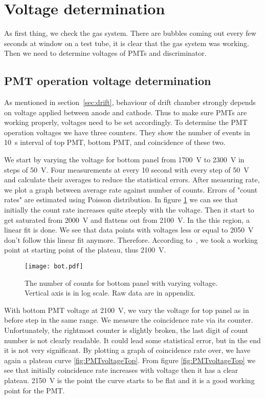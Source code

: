 \clearpage
\section{Voltage determination}\label{sec:vol}
As first thing, we check the gas system. There are bubbles coming out every few seconds at window on a test tube, it is clear that the gas system was working. Then we need to determine voltages of PMTs and discriminator. 

\subsection{PMT operation voltage determination}
As mentioned in section~\ref{sec:drift}, behaviour of drift chamber strongly depends on voltage applied between anode and cathode. Thus to make sure PMTs are working properly, voltages need to be set accordingly. To determine the PMT operation voltages we have three counters. They show the number of events in \SI{10}{\s} interval of top PMT, bottom PMT, and coincidence of these two.

We start by varying the voltage for bottom panel from \SI{1700}{\volt} to \SI{2300}{\volt} in steps of \SI{50}{\volt}. Four measurements at every \num{10} second with every step of \SI{50}{\volt} and calculate their averages to reduce the statistical errors. After measuring rate, we plot a graph between average rate against number of counts. Errors of "count rates" are estimated using Poisson distribution. In figure \ref{fig:PMTvoltageBot} we can see that initially the count rate increases quite steeply with the voltage. Then it start to get saturated from \SI{2000}{\volt} and flattens out from \SI{2100}{V}. In the this region, a linear fit is done. We see that data points with voltages less or equal to \SI{2050}{\volt} don't follow this linear fit anymore. Therefore. According to~\cite{manual}, we took a working point at starting point of the plateau, thus \SI{2100}{\volt}.

\begin{figure}[H]
\begin{center}
\texttt{[image: bot.pdf]}
	\end{center}
\caption{The number of counts for bottom panel with varying voltage. Vertical axis is in log scale. Raw data are in appendix.}
\label{fig:PMTvoltageBot}
\end{figure}

With bottom PMT voltage at \SI{2100}{\volt}, we vary the voltage for top panel as in before step in the same range. We measure the coincidence rate via its counter. Unfortunately, the rightmost counter is slightly broken, the last digit of count number is not clearly readable. It could lead some statistical error, but in the end it is not very significant. By plotting a graph of coincidence rate over, we have again a plateau curve \ref{fig:PMTvoltageTop}. From figure \ref{fig:PMTvoltageTop} we see that initially coincidence rate increases with voltage then it has a clear plateau. \SI{2150}{\volt} is the point the curve starts to be flat and it is a good working point for the PMT.
	
